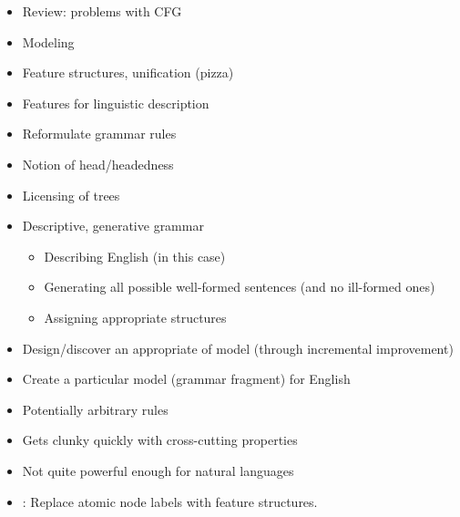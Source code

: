 \documentclass[a4paper,landscape,headrule,footrule]{foils}
\begin{document}

\maketitle



\begin{itemize}
\item Review: problems with CFG
\item Modeling
\item Feature structures, unification (pizza)
\item Features for linguistic description
\item Reformulate grammar rules
\item Notion of head/headedness
\item Licensing of trees
\end{itemize}


\begin{itemize}
\item Descriptive, generative grammar
  \begin{itemize}
  \item Describing English (in this case)
  \item Generating all possible well-formed
    sentences (and no ill-formed ones)
  \item Assigning appropriate structures
  \end{itemize}
\item Design/discover an appropriate  of
model (through incremental improvement)

\item Create a particular model (grammar
fragment) for English
\end{itemize}


\begin{itemize}
\item Potentially arbitrary rules
\item Gets clunky quickly with cross-cutting properties
\item Not quite powerful enough for natural languages
\item {}: Replace atomic node labels with feature structures.
\end{itemize}
\end{document}
